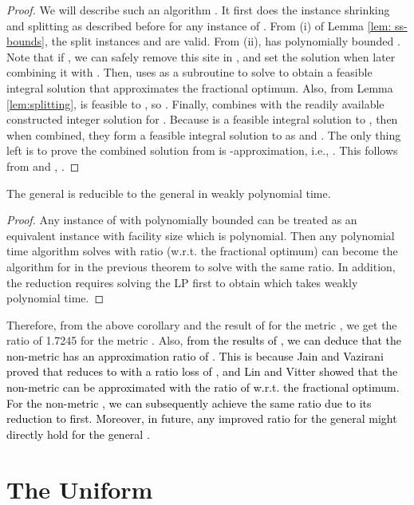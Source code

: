 \documentclass[10pt]{llncs}
\begin{document}
\begin{proof}
We will describe such an algorithm . It first does
the instance shrinking and splitting as described before for any instance
 of . From (i) of Lemma \ref{lem: ss-bounds},
the split instances  and  are
valid. From (ii),  has polynomially bounded .
Note that if , we can safely remove this site  in
, and set the solution 
when later combining it with . Then, 
uses  as a subroutine to solve  to
obtain a feasible integral solution 
that approximates the fractional optimum. Also, from Lemma \ref{lem:splitting},
 is feasible
to , so .
Finally,  combines 
with the readily available constructed integer solution 
for . Because 
is a feasible integral solution to , then when combined,
they form a feasible integral solution to  as 
and .
The only thing left is to prove the combined solution from 
is -approximation, i.e., .
This follows from 
and , .\end{proof}
\begin{corollary}
The general  is reducible to the general  in weakly
polynomial time.\end{corollary}
\begin{proof}
Any instance of  with polynomially bounded  can be
treated as an equivalent  instance with facility size 
which is polynomial. Then any polynomial time algorithm solves 
with ratio  (w.r.t. the fractional optimum) can become the
algorithm  for  in the previous theorem
to solve  with the same ratio. In addition, the reduction requires
solving the LP first to obtain 
which takes weakly polynomial time.
\end{proof}
Therefore, from the above corollary and the result of \cite{JaroslawFTFL1.725}
for the metric , we get the ratio of 1.7245 for the metric
. Also, \textcolor{black}{from the results of \cite{Jain00FTFL,Lin92filting},
we can deduce that the non-metric  has an approximation ratio
of . This is because Jain and Vazirani \cite{Jain00FTFL}
proved that  reduces to  with a ratio loss of ,
and Lin and Vitter \cite{Lin92filting} showed that the non-metric
 can be approximated with the ratio of 
w.r.t. the fractional optimum. For the non-metric , we can
subsequently achieve the same ratio due to its reduction to 
first. Moreover, in future, any improved ratio for the general 
might directly hold for the general .}


\section{The Uniform }
\end{document}
